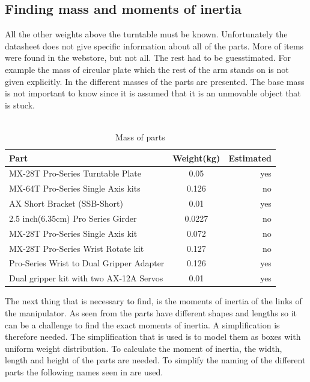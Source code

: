 \subsection{Finding mass and moments of inertia}\label{sec:massInert}
All the other weights above the turntable must be known. Unfortunately the datasheet does not give specific information about all of the parts. More of items were found in the webstore, but not all. The rest had to be guesstimated. For example the mass of circular plate which the rest of the arm stands on is not given explicitly. In  the different masses of the parts are presented. The base mass is not important to know since it is assumed that it is an unmovable object that is stuck. \\\\ 
\begin{table}[htbp]
\centering
\caption{Mass of parts}
\label{table:partmass}
    \begin{tabular}{l c r}
        \toprule
        Part  &  Weight(kg) & Estimated\\
        \midrule
        MX-28T Pro-Series Turntable Plate& 0.05 & yes\\
        MX-64T Pro-Series Single Axis kits& 0.126 & no\\
        AX Short Bracket (SSB-Short) & 0.01 & yes\\
        2.5 inch(6.35cm) Pro Series Girder & 0.0227 & no\\
        MX-28T Pro-Series Single Axis kit & 0.072 & no \\
        MX-28T Pro-Series Wrist Rotate kit & 0.127 & no\\
        Pro-Series Wrist to Dual Gripper Adapter & 0.126 & yes\\
        Dual gripper kit with two AX-12A Servos& 0.01 & yes\\
        \bottomrule
    \end{tabular}
\end{table}
The next thing that is necessary to find, is the moments of inertia of the links of the manipulator. As seen from  the parts have different shapes and lengths so it can be a challenge to find the exact moments of inertia. A simplification is therefore needed. The simplification that is used is to model them as boxes with uniform weight distribution. To calculate the moment of inertia, the width, length and height of the parts are needed. To simplify the naming of the different parts the following names seen in  are used.\\\\
